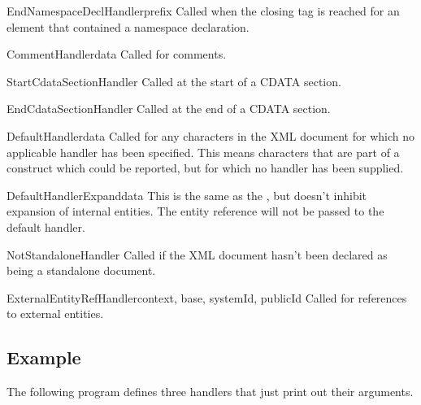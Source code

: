 \begin{methoddesc}[xmlparser]{EndNamespaceDeclHandler}{prefix}
Called when the closing tag is reached for an element 
that contained a namespace declaration.
\end{methoddesc}

\begin{methoddesc}[xmlparser]{CommentHandler}{data}
Called for comments.
\end{methoddesc}

\begin{methoddesc}[xmlparser]{StartCdataSectionHandler}{}
Called at the start of a CDATA section.
\end{methoddesc}

\begin{methoddesc}[xmlparser]{EndCdataSectionHandler}{}
Called at the end of a CDATA section.
\end{methoddesc}

\begin{methoddesc}[xmlparser]{DefaultHandler}{data}
Called for any characters in the XML document for
which no applicable handler has been specified.  This means
characters that are part of a construct which could be reported, but
for which no handler has been supplied. 
\end{methoddesc}

\begin{methoddesc}[xmlparser]{DefaultHandlerExpand}{data}
This is the same as the , 
but doesn't inhibit expansion of internal entities.
The entity reference will not be passed to the default handler.
\end{methoddesc}

\begin{methoddesc}[xmlparser]{NotStandaloneHandler}{}
Called if the XML document hasn't been declared as being a standalone
document.
\end{methoddesc}

\begin{methoddesc}[xmlparser]{ExternalEntityRefHandler}{context, base,
                                                        systemId, publicId}
Called for references to external entities.  
\end{methoddesc}


\subsection{Example \label{expat-example}}

The following program defines three handlers that just print out their
arguments.

